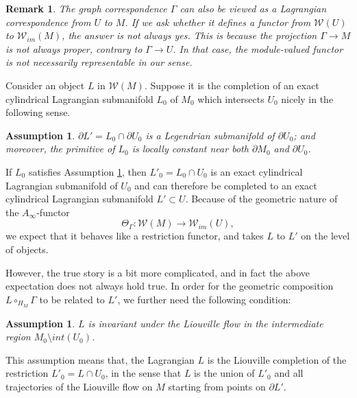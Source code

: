 \documentclass{amsart}
\newtheorem{remark}[theorem]{Remark}
\newtheorem{assumption}[theorem]{Assumption}
\numberwithin{equation}{section}
\numberwithin{figure}{section}
\begin{document}
\begin{remark}
	The graph correspondence $\Gamma$ can also be viewed as a Lagrangian correspondence from $U$ to $M$. If we ask whether it defines a functor from $\mathcal{W}(U)$ to $\mathcal{W}_{im}(M)$, the answer is not always yes. This is because the projection $\Gamma \to M$ is not always proper, contrary to $\Gamma \to U$. In that case, the module-valued functor is not necessarily representable in our sense.
\end{remark}

	Consider an object $L$ in $\mathcal{W}(M)$. Suppose it is the completion of an exact cylindrical Lagrangian submanifold $L_{0}$ of $M_{0}$ which intersects $U_{0}$ nicely in the following sense. \par

\begin{assumption}\label{strong exactness condition}
	$\partial L' = L_{0} \cap \partial U_{0}$ is a Legendrian submanifold of $\partial U_{0}$; and moreover, the primitive of $L_{0}$ is locally constant near both $\partial M_{0}$ and $\partial U_{0}$. 
\end{assumption}

	If $L_{0}$ satisfies Assumption \ref{strong exactness condition}, then $L'_{0} = L_{0} \cap U_{0}$ is an exact cylindrical Lagrangian submanifold of $U_{0}$ and can therefore be completed to an exact cylindrical Lagrangian submanifold $L' \subset U$. Because of the geometric nature of the $A_{\infty}$-functor 
\begin{equation*}
\Theta_{\Gamma}: \mathcal{W}(M) \to \mathcal{W}_{im}(U),
\end{equation*}
we expect that it behaves like a restriction functor, and takes $L$ to $L'$ on the level of objects. \par
	However, the true story is a bit more complicated, and in fact the above expectation does not always hold true. In order for the geometric composition $L \circ_{H_{M}} \Gamma$ to be related to $L'$, we further need the following condition: \par
	 
\begin{assumption}\label{invariance assumption}
	$L$ is invariant under the Liouville flow in the intermediate region $M_{0} \setminus int(U_{0})$.
\end{assumption}

	This assumption means that, the Lagrangian $L$ is the Liouville completion of the restriction $L'_{0} = L \cap U_{0}$, in the sense that $L$ is the union of $L'_{0}$ and all trajectories of the Liouville flow on $M$ starting from points on $\partial L'$. \par 
\end{document}
